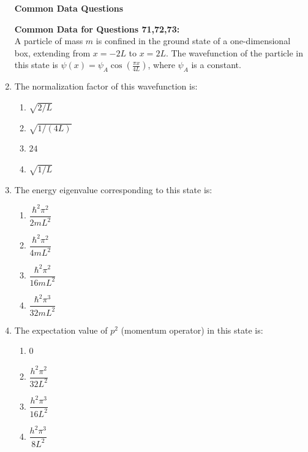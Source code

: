 \documentclass[journal,12pt,onecolumn]{IEEEtran}
\begin{document}
\begin{enumerate}[itemsep = 1em]
\newpage



\begin{center}
\textbf{Common Data Questions}     
\end{center}


\textbf{Common Data for Questions 71,72,73:} \\
A particle of mass $m$ is confined in the ground state of a one-dimensional box, extending from $x=-2L$ to $x=2L$. The wavefunction of the particle in this state is 
$\psi(x) = \psi_A \cos\left(\frac{\pi x}{4L}\right)$, where $\psi_A$ is a constant.


\item The normalization factor of this wavefunction is:

\hfill{}

\begin{multicols}{2}
\begin{enumerate}
    \item $\sqrt{2/L}$
    \item $\sqrt{1/(4L)}$
    \item $24$
    \item $\sqrt{1/L}$
\end{enumerate}
\end{multicols}

\item The energy eigenvalue corresponding to this state is:

\hfill{}

\begin{multicols}{2}
\begin{enumerate}
    \item $\dfrac{\hbar^2 \pi^2}{2 m L^2}$
    \item $\dfrac{\hbar^2 \pi^2}{4 m L^2}$
    \item $\dfrac{\hbar^2 \pi^2}{16 m L^2}$
    \item $\dfrac{\hbar^2 \pi^3}{32 m L^2}$
\end{enumerate}
\end{multicols}

\item The expectation value of $p^2$ (momentum operator) in this state is:

\hfill{}

\begin{multicols}{2}
\begin{enumerate}
    \item $0$
    \item $\dfrac{h^2 \pi^2}{32 L^2}$
    \item $\dfrac{h^2 \pi^3}{16 L^2}$
    \item $\dfrac{h^2 \pi^3}{8 L^2}$
\end{enumerate}
\end{multicols}




\end{enumerate}
\end{document}
